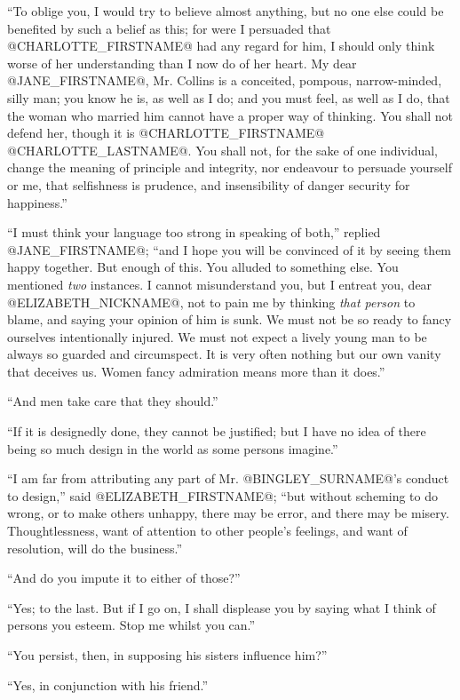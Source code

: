 ``To oblige you, I would try to believe almost anything, but no one else
could be benefited by such a belief as this; for were I persuaded that
@CHARLOTTE_FIRSTNAME@ had any regard for him, I should only think worse of her
understanding than I now do of her heart. My dear @JANE_FIRSTNAME@, Mr. Collins is a
conceited, pompous, narrow-minded, silly man; you know he is, as well as
I do; and you must feel, as well as I do, that the woman who married him
cannot have a proper way of thinking. You shall not defend her, though
it is @CHARLOTTE_FIRSTNAME@ @CHARLOTTE_LASTNAME@. You shall not, for the sake of one individual,
change the meaning of principle and integrity, nor endeavour to persuade
yourself or me, that selfishness is prudence, and insensibility of
danger security for happiness.''

``I must think your language too strong in speaking of both,'' replied
@JANE_FIRSTNAME@; ``and I hope you will be convinced of it by seeing them happy
together. But enough of this. You alluded to something else. You
mentioned \textit{two} instances. I cannot misunderstand you, but I entreat
you, dear @ELIZABETH_NICKNAME@, not to pain me by thinking \textit{that person} to blame, and
saying your opinion of him is sunk. We must not be so ready to fancy
ourselves intentionally injured. We must not expect a lively young man
to be always so guarded and circumspect. It is very often nothing but
our own vanity that deceives us. Women fancy admiration means more than
it does.''

``And men take care that they should.''

``If it is designedly done, they cannot be justified; but I have no idea
of there being so much design in the world as some persons imagine.''

``I am far from attributing any part of Mr. @BINGLEY_SURNAME@'s conduct to design,''
said @ELIZABETH_FIRSTNAME@; ``but without scheming to do wrong, or to make others
unhappy, there may be error, and there may be misery. Thoughtlessness,
want of attention to other people's feelings, and want of resolution,
will do the business.''

``And do you impute it to either of those?''

``Yes; to the last. But if I go on, I shall displease you by saying what
I think of persons you esteem. Stop me whilst you can.''

``You persist, then, in supposing his sisters influence him?''

``Yes, in conjunction with his friend.''

